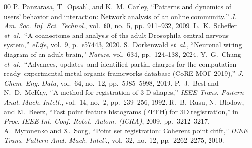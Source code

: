\documentclass[conference]{IEEEtran}
\begin{document}
\begin{thebibliography}{00}
 P.~Panzarasa, T.~Opsahl, and K.~M.~Carley, ``Patterns and dynamics of users' behavior and interaction: Network analysis of an online community,'' \textit{J. Am. Soc. Inf. Sci. Technol.}, vol.~60, no.~5, pp.~911--932, 2009.
 L.~K.~Scheffer \textit{et~al.}, ``A connectome and analysis of the adult Drosophila central nervous system,'' \textit{eLife}, vol.~9, p.~e57443, 2020.
 S.~Dorkenwald \textit{et~al.}, ``Neuronal wiring diagram of an adult brain,'' \textit{Nature}, vol.~634, pp.~124--138, 2024.
 Y.~G.~Chung \textit{et~al.}, ``Advances, updates, and identified partial charges for the computation-ready, experimental metal-organic frameworks database (CoRE MOF 2019),'' \textit{J. Chem. Eng. Data}, vol.~64, no.~12, pp.~5985--5998, 2019.
 P.~J.~Besl and N.~D.~McKay, ``A method for registration of 3-D shapes,'' \textit{IEEE Trans. Pattern Anal. Mach. Intell.}, vol.~14, no.~2, pp.~239--256, 1992.
 R.~B.~Rusu, N.~Blodow, and M.~Beetz, ``Fast point feature histograms (FPFH) for 3D registration,'' in \textit{Proc. IEEE Int. Conf. Robot. Autom. (ICRA)}, 2009, pp.~3212--3217.
 A.~Myronenko and X.~Song, ``Point set registration: Coherent point drift,'' \textit{IEEE Trans. Pattern Anal. Mach. Intell.}, vol.~32, no.~12, pp.~2262--2275, 2010.

\end{thebibliography}
\end{document}
